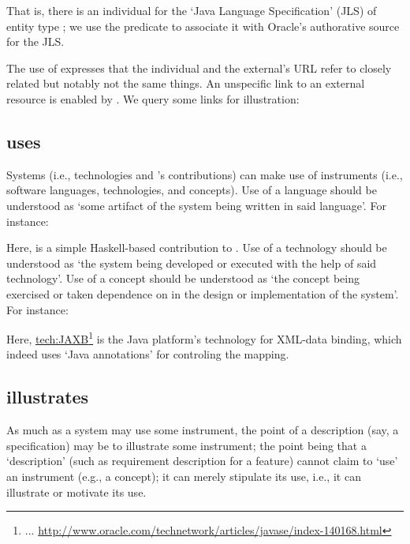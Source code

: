\noindent
That is, there is an \solasote{} individual for the `Java Language
Specification' (JLS) of entity type ; we use the
 predicate to associate it with Oracle's authorative
source for the JLS.

The use of  expresses that the \solasote{}
individual and the external's URL refer to closely related but notably
not the same things. An unspecific link to an external resource is
enabled by . We query some links for illustration:




\subsection{uses} 
\label{S:uses}

Systems (i.e., technologies and \ooo{}'s contributions) can make use
of instruments (i.e., software languages, technologies, and
concepts). Use of a language should be understood as `some artifact of
the system being written in said language'. For instance:


\noindent
Here,  is a simple Haskell-based contribution
to \ooo{}. Use of a technology should be understood as `the system
being developed or executed with the help of said technology'. Use of
a concept should be understood as `the concept being exercised or
taken dependence on in the design or implementation of the
system'. For instance:


\noindent
Here, \url{tech:JAXB}\footnote{... 
  \url{http://www.oracle.com/technetwork/articles/javase/index-140168.html}}
is the Java platform's technology for XML-data binding, which indeed
uses `Java annotations' for controling the mapping.


\subsection{illustrates}

As much as a system may use some instrument, the point of a
description (say, a specification) may be to illustrate some
instrument; the point being that a `description' (such as requirement
description for a feature) cannot claim to `use' an instrument (e.g.,
a concept); it can merely stipulate its use, i.e., it can illustrate
or motivate its use.

